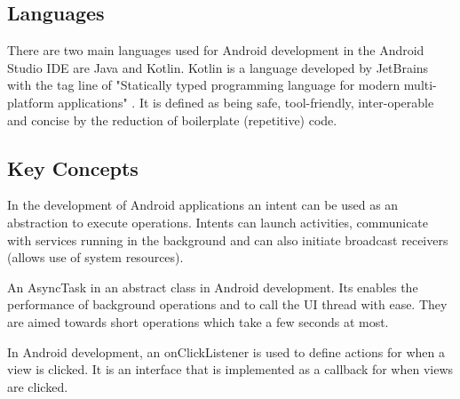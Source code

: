 \tocless\subsection{Languages}
There are two main languages used for Android development in the Android Studio IDE are Java and Kotlin.
Kotlin is a language developed by JetBrains with the tag line of "Statically typed programming language for modern multi-platform applications" \parencite{kotlin}.
It is defined as being safe, tool-friendly, inter-operable and concise by the reduction of boilerplate (repetitive) code.

\tocless\subsection{Key Concepts}
In the development of Android applications an intent can be used as an abstraction to execute operations.
Intents can launch activities, communicate with services running in the background and can also initiate broadcast receivers (allows use of system resources).

An AsyncTask in an abstract class in Android development.
Its enables the performance of background operations and to call the UI thread with ease.
They are aimed towards short operations which take a few seconds at most.

In Android development, an onClickListener is used to define actions for when a view is clicked.
It is an interface that is implemented as a callback for when views are clicked.